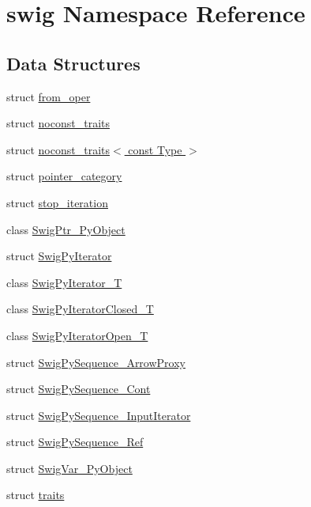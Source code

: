 \hypertarget{namespaceswig}{}\section{swig Namespace Reference}
\label{namespaceswig}
\subsection*{Data Structures}
\begin{DoxyCompactItemize}
\item 
struct \hyperlink{structswig_1_1from__oper}{from\+\_\+oper}
\item 
struct \hyperlink{structswig_1_1noconst__traits}{noconst\+\_\+traits}
\item 
struct \hyperlink{structswig_1_1noconst__traits_3_01const_01_type_01_4}{noconst\+\_\+traits$<$ const Type $>$}
\item 
struct \hyperlink{structswig_1_1pointer__category}{pointer\+\_\+category}
\item 
struct \hyperlink{structswig_1_1stop__iteration}{stop\+\_\+iteration}
\item 
class \hyperlink{classswig_1_1_swig_ptr___py_object}{Swig\+Ptr\+\_\+\+Py\+Object}
\item 
struct \hyperlink{structswig_1_1_swig_py_iterator}{Swig\+Py\+Iterator}
\item 
class \hyperlink{classswig_1_1_swig_py_iterator___t}{Swig\+Py\+Iterator\+\_\+T}
\item 
class \hyperlink{classswig_1_1_swig_py_iterator_closed___t}{Swig\+Py\+Iterator\+Closed\+\_\+T}
\item 
class \hyperlink{classswig_1_1_swig_py_iterator_open___t}{Swig\+Py\+Iterator\+Open\+\_\+T}
\item 
struct \hyperlink{structswig_1_1_swig_py_sequence___arrow_proxy}{Swig\+Py\+Sequence\+\_\+\+Arrow\+Proxy}
\item 
struct \hyperlink{structswig_1_1_swig_py_sequence___cont}{Swig\+Py\+Sequence\+\_\+\+Cont}
\item 
struct \hyperlink{structswig_1_1_swig_py_sequence___input_iterator}{Swig\+Py\+Sequence\+\_\+\+Input\+Iterator}
\item 
struct \hyperlink{structswig_1_1_swig_py_sequence___ref}{Swig\+Py\+Sequence\+\_\+\+Ref}
\item 
struct \hyperlink{structswig_1_1_swig_var___py_object}{Swig\+Var\+\_\+\+Py\+Object}
\item 
struct \hyperlink{structswig_1_1traits}{traits}

\end{DoxyCompactItemize}
